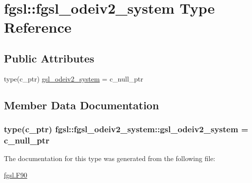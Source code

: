 \hypertarget{structfgsl_1_1fgsl__odeiv2__system}{\section{fgsl\-:\-:fgsl\-\_\-odeiv2\-\_\-system Type Reference}
\label{structfgsl_1_1fgsl__odeiv2__system}
}
\subsection*{Public Attributes}
\begin{DoxyCompactItemize}
\item 
type(c\-\_\-ptr) \hyperlink{structfgsl_1_1fgsl__odeiv2__system_ab4c71db38dc1a1f7f123af8266dc11aa}{gsl\-\_\-odeiv2\-\_\-system} = c\-\_\-null\-\_\-ptr
\end{DoxyCompactItemize}


\subsection{Member Data Documentation}
\hypertarget{structfgsl_1_1fgsl__odeiv2__system_ab4c71db38dc1a1f7f123af8266dc11aa}{
\subsubsection[{gsl\-\_\-odeiv2\-\_\-system}]{\setlength{\rightskip}{0pt plus 5cm}type(c\-\_\-ptr) fgsl\-::fgsl\-\_\-odeiv2\-\_\-system\-::gsl\-\_\-odeiv2\-\_\-system = c\-\_\-null\-\_\-ptr}}\label{structfgsl_1_1fgsl__odeiv2__system_ab4c71db38dc1a1f7f123af8266dc11aa}


The documentation for this type was generated from the following file\-:\begin{DoxyCompactItemize}
\item 
\hyperlink{fgsl_8F90}{fgsl.\-F90}\end{DoxyCompactItemize}
